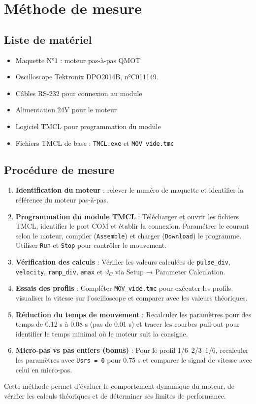 \section{Méthode de mesure}
\subsection{Liste de matériel}
\begin{itemize}
    \item Maquette N°1 : moteur pas-à-pas QMOT
    \item Oscilloscope Tektronix DPO2014B, n°C011149.
     \item Câbles RS-232 pour connexion au module
    \item Alimentation 24V pour le moteur
    \item Logiciel TMCL pour programmation du module
    \item Fichiers TMCL de base : \texttt{TMCL.exe} et \texttt{MOV\_vide.tmc}
\end{itemize}
\subsection{Procédure de mesure}
\begin{enumerate}
    \item \textbf{Identification du moteur} : relever le numéro de maquette et identifier la référence du moteur pas-à-pas.
    
    \item \textbf{Programmation du module TMCL} :  
    Télécharger et ouvrir les fichiers TMCL, identifier le port COM et établir la connexion. Paramétrer le courant selon le moteur, compiler (\texttt{Assemble}) et charger (\texttt{Download}) le programme. Utiliser \texttt{Run} et \texttt{Stop} pour contrôler le mouvement.

    \item \textbf{Vérification des calculs} :  
    Vérifier les valeurs calculées de \texttt{pulse\_div}, \texttt{velocity}, \texttt{ramp\_div}, \texttt{amax} et \(\vartheta_C\) via Setup → Parameter Calculation.

    \item \textbf{Essais des profils} :  
    Compléter \texttt{MOV\_vide.tmc} pour exécuter les profils, visualiser la vitesse sur l’oscilloscope et comparer avec les valeurs théoriques.

    \item \textbf{Réduction du temps de mouvement} :  
    Recalculer les paramètres pour des temps de 0.12 s à 0.08 s (pas de 0.01 s) et tracer les courbes pull-out pour identifier le temps minimal où le moteur suit la consigne.

    \item \textbf{Micro-pas vs pas entiers (bonus)} :  
    Pour le profil 1/6--2/3--1/6, recalculer les paramètres avec \texttt{Usrs = 0} pour 0.75 s et comparer le signal de vitesse avec celui en micro-pas.
\end{enumerate}

Cette méthode permet d’évaluer le comportement dynamique du moteur, de vérifier les calculs théoriques et de déterminer ses limites de performance.